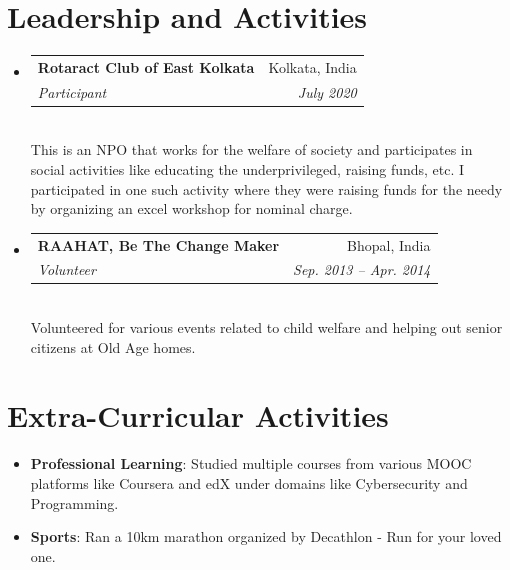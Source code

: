\documentclass[letterpaper,11pt]{article}
\makeatletter
\newcommand{\resumeSubheading}[4]{
  \vspace{-2pt}\item
    \begin{tabular*}{0.97\textwidth}[t]{l@{\extracolsep{\fill}}r}
      \textbf{#1} & #2 \\
      \textit{\small#3} & \textit{\small #4} \\
    \end{tabular*}\vspace{-7pt}
}
\newcommand{\resumeSubHeadingListStart}{\begin{itemize}[leftmargin=0.15in, label={}]}
\newcommand{\resumeSubHeadingListEnd}{\end{itemize}}
\makeatother
\begin{document}
\section{Leadership and Activities}
 \resumeSubHeadingListStart
  \resumeSubheading
     {Rotaract Club of East Kolkata}{Kolkata, India}
     {Participant}{July 2020} \vspace{2px} \\
     {This is an NPO that works for the welfare of society and participates in social activities like educating the underprivileged, raising funds, etc. I participated in one such activity where they were raising funds for the needy by organizing an excel workshop for nominal charge.}
  \resumeSubheading
     {RAAHAT, Be The Change Maker}{Bhopal, India}
     {Volunteer}{Sep. 2013 -- Apr. 2014} \vspace{2px} \\
     {Volunteered for various events related to child welfare and helping out senior citizens at Old Age homes.}
 \resumeSubHeadingListEnd

\section{Extra-Curricular Activities}
 \begin{itemize}
     \item { \textbf {Professional Learning}{: Studied multiple courses from various MOOC platforms like Coursera and edX under domains like Cybersecurity and Programming.}}
     \item {\textbf {Sports}{: Ran a 10km marathon organized by Decathlon - Run for your loved one.}}
 \end{itemize}

\end{document}
